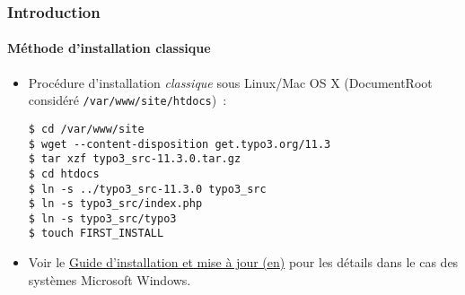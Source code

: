 %

\begin{frame}[fragile]
	\frametitle{Introduction}
	\framesubtitle{Méthode d'installation classique}


	\begin{itemize}
		\item Procédure d'installation \textit{classique} sous Linux/Mac OS X\newline
			(DocumentRoot considéré \texttt{/var/www/site/htdocs})~:
\begin{lstlisting}
$ cd /var/www/site
$ wget --content-disposition get.typo3.org/11.3
$ tar xzf typo3_src-11.3.0.tar.gz
$ cd htdocs
$ ln -s ../typo3_src-11.3.0 typo3_src
$ ln -s typo3_src/index.php
$ ln -s typo3_src/typo3
$ touch FIRST_INSTALL
\end{lstlisting}

		\item Voir le \href{https://docs.typo3.org/m/typo3/guide-installation/master/en-us/}{Guide d'installation et mise à jour (en)}
			pour les détails dans le cas des systèmes Microsoft Windows.

	\end{itemize}
\end{frame}


